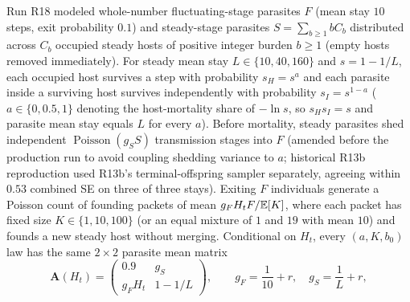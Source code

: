 Run R18 modeled whole-number fluctuating-stage parasites $F$ (mean stay $10$ steps, exit probability $0.1$) and steady-stage parasites $S = \sum_{b \ge 1} b C_b$ distributed across $C_b$ occupied steady hosts of positive integer burden $b \ge 1$ (empty hosts removed immediately). For steady mean stay $L \in \{10, 40, 160\}$ and $s = 1 - 1/L$, each occupied host survives a step with probability $s_H = s^a$ and each parasite inside a surviving host survives independently with probability $s_I = s^{1-a}$ ($a \in \{0, 0.5, 1\}$ denoting the host-mortality share of $-\ln s$, so $s_H s_I = s$ and parasite mean stay equals $L$ for every $a$). Before mortality, steady parasites shed independent $\operatorname{Poisson}(g_S S)$ transmission stages into $F$ (amended before the production run to avoid coupling shedding variance to $a$; historical R13b reproduction used R13b's terminal-offspring sampler separately, agreeing within $0.53$ combined SE on three of three stays). Exiting $F$ individuals generate a Poisson count of founding packets of mean $g_F H_t F / \mathbb{E}[K]$, where each packet has fixed size $K \in \{1, 10, 100\}$ (or an equal mixture of $1$ and $19$ with mean $10$) and founds a new steady host without merging. Conditional on $H_t$, every $(a, K, b_0)$ law has the same $2 \times 2$ parasite mean matrix
\begin{equation}\label{num-esm-eq-r18-mean}
\mathbf{A}(H_t) = \begin{pmatrix} 0.9 & g_S \\ g_F H_t & 1 - 1/L \end{pmatrix}, \qquad g_F = \frac{1}{10} + r, \quad g_S = \frac{1}{L} + r,
\end{equation}
